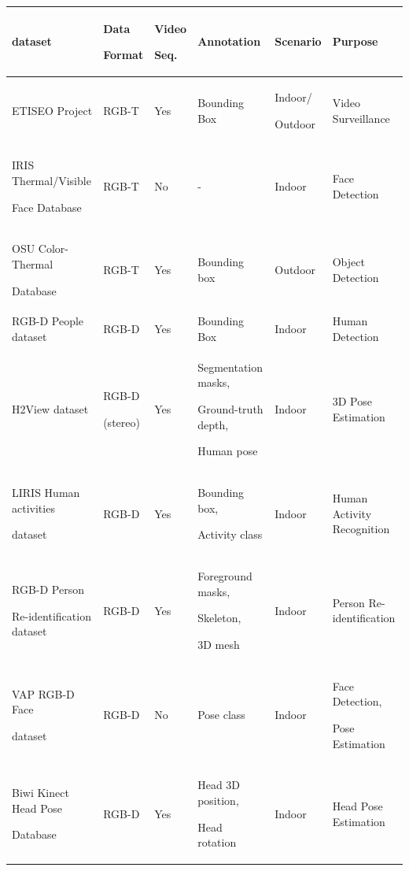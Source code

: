 \documentclass[10pt,twocolumn,letterpaper]{article}
\begin{document}
\begin{table}[htpb]
\centering
\begin{tabular}{p{4cm}p{1.5cm}p{0.7cm}p{3cm}p{1.2cm}p{4.1cm}}
\hline
dataset & Data \par Format\strut & Video \par Seq.\strut & Annotation & Scenario & Purpose \\ \hline
ETISEO Project \cite{nghiem2007etiseo} & RGB-T & Yes & Bounding Box & Indoor/ \par Outdoor\strut & Video Surveillance \\
IRIS Thermal/Visible \par Face Database \cite{iris2007dataset}\strut	&	RGB-T	&	No	&	-	&	Indoor	&	Face Detection \\
OSU Color-Thermal \par Database \cite{davis2007background}\strut	&	RGB-T	&	Yes	&	Bounding box	&	Outdoor	&	Object Detection \\
RGB-D People dataset \cite{spinello2011people}	&	RGB-D	&	Yes	&	Bounding Box	&	Indoor	&	Human Detection \\
H2View dataset \cite{sheasby2012simultaneous}	&	RGB-D  \par(stereo)\strut 	&	Yes	&	Segmentation masks, \par Ground-truth depth,\strut \par Human pose\strut	&	Indoor	&	3D Pose Estimation \\
LIRIS Human activities \par dataset \cite{wolf2012liris}\strut	&	RGB-D	&	Yes	& Bounding box, \par Activity class\strut	&	Indoor	&	Human Activity Recognition \\
RGB-D Person \par Re-identification dataset \cite{barbosa2012re}\strut	&	RGB-D	&	Yes	&	Foreground masks, \par Skeleton,\strut \par3D mesh\strut 	&	Indoor	&	Person Re-identification \\
VAP RGB-D Face \par dataset \cite{hg2012rgb}\strut	&	RGB-D	&	No	&	Pose class	&	Indoor	&	Face Detection, \par Pose Estimation\strut \\
Biwi Kinect Head Pose \par Database \cite{fanelli2013random}\strut	&	RGB-D	&	Yes	&	Head 3D position, \par Head rotation\strut	&	Indoor	&	Head Pose Estimation \\

\end{tabular}
\end{table}
\end{document}
